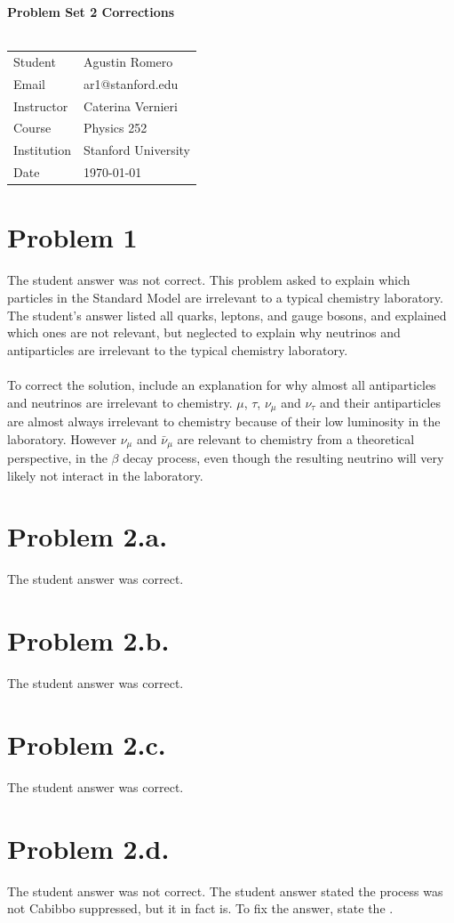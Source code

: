 \documentclass{article}
\begin{document}
\begin{center}
\textbf{\Large{Problem Set 2 Corrections}}\\~\\
\begin{tabular}{l l}
Student&Agustin Romero\\
Email&ar1@stanford.edu\\
Instructor&Caterina Vernieri\\
Course&Physics 252\\
Institution&Stanford University\\
Date&\today\\
\end{tabular}
\end{center}
\section*{Problem 1}
The student answer was not correct. This problem asked to explain which particles in the Standard Model are irrelevant to a typical chemistry laboratory. The student's answer listed all quarks, leptons, and gauge bosons, and explained which ones are not relevant, but neglected to explain why neutrinos and antiparticles are irrelevant to the typical chemistry laboratory.\\~\\
To correct the solution, include an explanation for why almost all antiparticles and neutrinos are irrelevant to chemistry. $\mu$, $\tau$, $\nu_\mu$ and $\nu_\tau$ and their antiparticles are almost always irrelevant to chemistry because of their low luminosity in the laboratory. However $\nu_\mu$ and $\bar{\nu}_\mu$ are relevant to chemistry from a theoretical perspective, in the $\beta$ decay process, even though the resulting neutrino will very likely not interact in the laboratory.
\section*{Problem 2.a.}
The student answer was correct.
\section*{Problem 2.b.}
The student answer was correct.
\section*{Problem 2.c.}
The student answer was correct.
\section*{Problem 2.d.}
The student answer was not correct. The student answer stated the process was not Cabibbo suppressed, but it in fact is. To fix the answer, state the .
\end{document}
